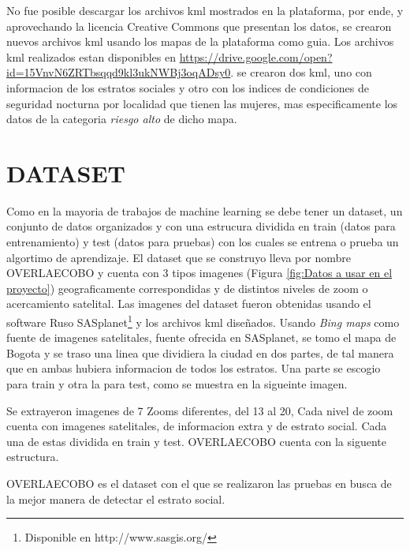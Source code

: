  No fue posible descargar los archivos kml mostrados en la plataforma, por ende, y aprovechando la licencia Creative Commons que presentan los datos, se crearon nuevos archivos kml usando los mapas de la plataforma como guia. Los archivos kml realizados estan disponibles en \url{https://drive.google.com/open?id=15VnvN6ZRTbsqqd9kl3ukNWBj3oqADsy0}. se crearon dos kml, uno con informacion de los estratos sociales y otro con los indices de condiciones de seguridad nocturna por localidad que tienen las mujeres, mas especificamente los datos de la categoria \textit{riesgo alto} de dicho mapa. 


 \section{DATASET}
 Como en la mayoria de trabajos de machine learning se debe tener un dataset, un conjunto de datos organizados y con una estrucura dividida en train (datos para entrenamiento) y test (datos para pruebas) con los cuales se entrena o prueba un algortimo de aprendizaje. El dataset que se construyo lleva por nombre OVERLAECOBO y cuenta con 3 tipos imagenes (Figura \ref{fig:Datos a usar en el proyecto}) geograficamente correspondidas y de distintos niveles de zoom o acercamiento satelital.  
 Las imagenes del dataset fueron obtenidas usando el software Ruso SASplanet\footnote[14]{Disponible en http://www.sasgis.org/} y los archivos kml diseñados. Usando  \textit{Bing maps} como fuente de imagenes satelitales, fuente ofrecida en SASplanet, se tomo el mapa de Bogota y se traso una linea que dividiera la ciudad en dos partes, de tal manera que en ambas hubiera informacion de todos los estratos. Una parte se escogio para train y otra la para test, como se muestra en la sigueinte imagen.
 
 
  Se extrayeron imagenes de 7 Zooms diferentes,  del 13 al 20,  Cada nivel de zoom cuenta con imagenes satelitales, de informacion extra y de estrato social. Cada una de estas dividida en train y test. OVERLAECOBO cuenta con la siguente estructura.
 
 
 OVERLAECOBO es el dataset con el que se realizaron las pruebas en busca de la mejor manera de detectar el estrato social.
 
